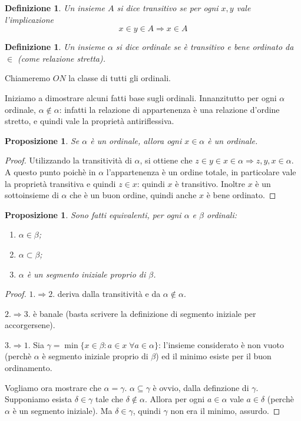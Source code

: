 \documentclass[a4paper,10pt,oneside]{article}
\newcommand{\myname}[1]{\emph{#1}}
\newcommand{\nin}{\not\in}
\theoremstyle{plain}
\newtheorem{mydef}[mytheorem]{Definizione}
\newtheorem{myprop}[mytheorem]{Proposizione}
\theoremstyle{definition}
\theoremstyle{remark}
\begin{document}
\begin{mydef}
 Un insieme $A$ si dice \myname{transitivo} se per ogni $x,y$ vale l'implicazione 
 \[x\in y \in A \Rightarrow x\in A\]
\end{mydef}

\begin{mydef}
Un insieme $\alpha$ si dice \myname{ordinale} se è transitivo e bene ordinato da $\in$ (come relazione stretta).
\end{mydef}

Chiameremo $ON$ la classe di tutti gli ordinali.

Iniziamo a dimostrare alcuni fatti base sugli ordinali. Innanzitutto per ogni $\alpha$ ordinale, $\alpha \not\in \alpha$: infatti la relazione di appartenenza è una relazione d'ordine stretto, e quindi vale la proprietà antiriflessiva.

\begin{myprop}\label{prop:xinord}
Se $\alpha$ è un ordinale, allora ogni $x\in \alpha$ è un ordinale.
\end{myprop}
\begin{proof}
 Utilizzando la transitività di $\alpha$, si ottiene che $z\in y \in x \in \alpha\Rightarrow z,y,x\in \alpha$. A questo punto poichè in $\alpha$ l'appartenenza è un ordine totale, in particolare vale la proprietà transitiva e quindi $z\in x$: quindi $x$ è transitivo. Inoltre $x$ è un sottoinsieme di $\alpha$ che è un buon ordine, quindi anche $x$ è bene ordinato.
\end{proof}

\begin{myprop}
Sono fatti equivalenti, per ogni $\alpha$ e $ \beta$ ordinali:
\begin{enumerate}
 \item $\alpha \in \beta$;
 \item $\alpha \subset \beta$;
 \item $\alpha$ è un segmento iniziale proprio di $\beta$.
\end{enumerate}
\end{myprop}
\begin{proof}
 $1. \Rightarrow 2.$ deriva dalla transitività e da $\alpha \nin \alpha$. 
 
 $2. \Rightarrow 3.$ è banale (basta scrivere la definizione di segmento iniziale per accorgersene).
 
 $3. \Rightarrow 1.$ Sia $\gamma = \min\{x\in\beta: a\in x \; \forall a\in \alpha \}$: l'insieme considerato è non vuoto (perchè $\alpha$ è segmento iniziale proprio di $\beta$) ed il minimo esiste per il buon ordinamento. 
 
 Vogliamo ora mostrare che $\alpha = \gamma$. $\alpha \subseteq \gamma$ è ovvio, dalla definzione di $\gamma$. Supponiamo esista $\delta\in\gamma$ tale che $\delta \nin \alpha$. Allora per ogni $a \in \alpha$ vale $a \in \delta$ (perchè $\alpha$ è un segmento iniziale). Ma $\delta \in \gamma$, quindi $\gamma$ non era il minimo, assurdo.
\end{proof}
\end{document}
